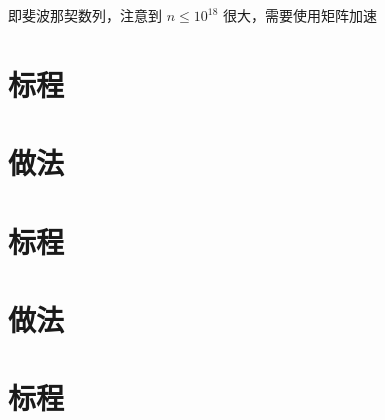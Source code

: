 \documentclass{ctsol}
\begin{document}
即斐波那契数列，注意到 $n \leq {10}^{18}$ 很大，需要使用矩阵加速

\section*{标程}


\makesolution
\section*{做法}

\section*{标程}


\makesolution
\section*{做法}

\section*{标程}

\end{document}
